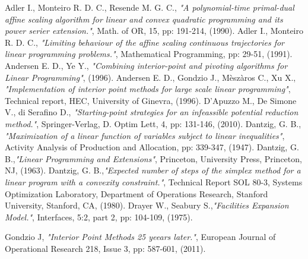 \documentclass[a4paper,10 pt,titlepage,twoside]{book}
\theoremstyle{plain}
\theoremstyle{definition}
\theoremstyle{remark}
\begin{document}
\begin{thebibliography}{9}
	
	 Adler I., Monteiro R. D. C., Resende M. G. C., \emph{"A polynomial-time primal-dual affine scaling algorithm for linear and convex quadratic programming and its power serier extension."}, Math. of OR, 15, pp: 191-214, (1990).
	 Adler I., Monteiro R. D. C., \emph{ "Limiting behaviour of the affine scaling continuous trajectories for linear programming problems."}, Mathematical Programming, pp: 29-51, (1991).
	 Andersen E. D., Ye Y.,  \textit{"Combining interior-point and pivoting algorithms for Linear Programming"}, (1996).
	 Andersen E. D., Gondzio J., Mèszàros C., Xu X., \textit{"Implementation of interior point methods for large scale linear programming"}, Technical report, HEC,
    University of Ginevra, (1996).
	 D'Apuzzo M., De Simone V., di Serafino D., \emph{ "Starting-point strategies for an infeassible potential reduction method."}, Springer-Verlag, D. Optim Lett, 4, pp: 131-146, (2010).
	Dantzig, G. B.,\textit{ "Maximization of a linear function of variables subject to linear
	inequalities"}, Activity Analysis of Production and Allocation, pp: 339-347, (1947).
	Dantzig, G. B.,\emph{\;"Linear Programming and Extensions"}, Princeton, University Press, Princeton, NJ, (1963).	
	Dantzig, G. B.,\emph{\;"Expected number of steps of the simplex method for a linear program with a convexity constraint."}, Technical Report SOL 80-3, Systems Optimization Laboratory, Department of Operations Research, Stanford University, Stanford, CA, (1980).
	Drayer W., Seabury S.,\emph{\;"Facilities Expansion Model."}, Interfaces, 5:2, part 2, pp: 104-109, (1975).
	
	
	 Gondzio J, \textit{ "Interior Point Methods 25 yeears later."}, European Journal of Operational Research 218, Issue 3, pp: 587-601, (2011).	
	

\end{thebibliography}
\end{document}
